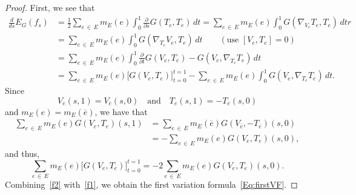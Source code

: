 \documentclass[11pt]{article}
\theoremstyle{definition}
\numberwithin{equation}{section}
\newcommand{\p}{\psi}
\newcommand*\wbar{\overline}
\renewcommand*\p{\partial}
\begin{document}
\begin{proof}
First, we see that
\begin{equation}\label{f1}
\begin{aligned}
\frac{d}{d s} E_G(f_{s}) &=\frac{1}{2}\sum_{e\,\in\,E}m_E(e)\int_0^1 \frac{\p}{\p s}G\left(T_e, T_e\right)\,dt =\sum_{e\,\in\,E}m_E(e)\int_0^1 G\left(\nabla_{V_e}T_e, T_e\right)\, dtr\\
&=\sum_{e\,\in\,E}m_E(e)\int_0^1G\left(\nabla_{T_e}V_e, T_e\right)\, dt \qquad  \left(\text{use }[V_e, T_e]=0\right)\\
&=\sum_{e\,\in\,E}m_E(e)\int_0^1\frac{\p}{\p t}G(V_e, T_e)- G\left(V_e, \nabla_{T_e}T_e\right)\, dt\\
&=\sum_{e\,\in\,E}m_E(e)\big[G\left(V_e, T_e\right)\big]_{t=0}^{t=1}-\sum_{e\,\in\,E}m_E(e)\int_0^1 G\left(V_e, \nabla_{T_e}T_e\right)\, dt.
\end{aligned}
\end{equation}
Since
\begin{equation}\label{Eq:ap1}
V_e(s, 1)=V_{\wbar e}(s, 0) \quad \text{and} \quad T_e(s,1)=- T_{\wbar e}(s,0)
\end{equation}
and $m_E(e)=m_E(\overline{e})$, we have that
\begin{align*}
\sum_{e\,\in\,E}m_E(e)G\left(V_e, T_e\right)(s,1) &=\sum_{e\,\in\,E}m_E(\overline{e})G\left( V_{\overline{e}}, -T_{\wbar e}\right)(s,0)\\
&=-\sum_{e\,\in\,E}m_E(e)G\left( V_e, T_e\right)(s,0),
\end{align*}
and thus,
\begin{equation}\label{f2}
\sum_{e\,\in\,E}m_E(e)\big[G\left(V_e, T_e\right)\big]_{t=0}^{t=1}=-2\sum_{e\,\in\,E}m_E(e)G\left(V_e, T_e\right)(s,0).
\end{equation}
Combining~\eqref{f2} with~\eqref{f1}, we obtain the first variation formula~\eqref{Eq:firstVF}.



\end{proof}
\end{document}
